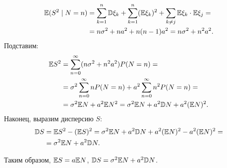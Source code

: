 \documentclass[../main.tex]{subfiles}
\begin{document}
\begin{exmpl}
\begin{itemize}
\begin{align*}
    \mathbb E (S^{2} \mid N = n) &= \sum_{k=1}^{n} \mathbb D\xi_k + \sum_{k=1}^{n} (\mathbb E\xi_k)^{2} + \sum_{k \neq j} \mathbb E\xi_k \cdot \mathbb E\xi_j = \\
    &= n\sigma^{2} + na^{2} + n(n-1)a^{2} = n\sigma^{2} + n^{2}a^{2}.
   \end{align*} Подставим:
   \begin{align*}
    \mathbb E S^{2} &= \sum_{n=0}^{\infty}(n\sigma^{2} + n^{2}a^{2})P(N=n) = \\
    &= \sigma^{2} \sum_{n=0}^{\infty} nP(N=n) + a^{2} \sum_{n=0}^{\infty} n^{2}P(N=n) = \\
    &= \sigma^{2}\mathbb E N + a^{2}\mathbb E N^{2} = \sigma^{2}\mathbb E N + a^{2}\mathbb D N + a^{2}(\mathbb E N)^{2}.
   \end{align*} Наконец, выразим дисперсию $ S $:
   \begin{align*}
    \mathbb D S &= \mathbb E S^{2} - (\mathbb E S)^{2} = \sigma^{2}\mathbb E N + a^{2}\mathbb D N + a^{2}(\mathbb E N)^{2} - a^{2}(\mathbb E N)^{2} = \\
    &= \sigma^{2}\mathbb E N + a^{2} \mathbb D N.
   \end{align*}
 \end{itemize} Таким образом, $ \mathbb E S = a \mathbb E N $, $ \mathbb D S = \sigma^{2}\mathbb E N  + a^{2} \mathbb D N $.
\end{exmpl}
\end{document}
